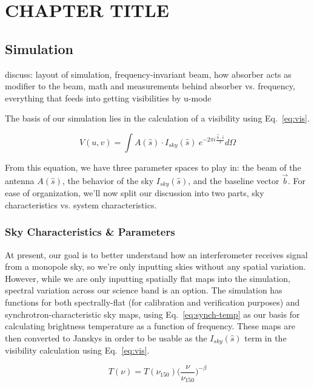 \chapter{CHAPTER TITLE}

\section{Simulation}

discuss: layout of simulation, frequency-invariant beam, how absorber acts as 
modifier to the beam, math and measurements behind absorber vs. frequency, 
everything that feeds into getting visibilities by u-mode

The basis of our simulation lies in the calculation of a visibility using 
Eq.~\eqref{eq:vis}.

\begin{equation}
    \label{eq:vis}
    V(u,v) = \int A(\hat{s}) \cdot I_{sky}(\hat{s}) ~e^{-2 \pi i \frac{\vec{b} 
    \cdot \hat{s}}{\lambda}} d\Omega
\end{equation}

From this equation, we have three parameter spaces to play in: the beam of the 
antenna $A(\hat{s})$, the behavior of the sky $I_{sky}(\hat{s})$, and the 
baseline vector $\vec{b}$. For ease of organization, we'll now split our 
discussion into two parts, sky characteristics vs. system characteristics.

\subsection{Sky Characteristics \& Parameters}

At present, our goal is to better understand how an interferometer receives 
signal from a monopole sky, so we're only inputting skies without any
spatial variation. However, while we are only inputting spatially flat maps 
into the simulation, spectral variation across our science band is an option.  
The simulation has functions for both spectrally-flat (for calibration and 
verification purposes) and synchrotron-characteristic sky maps, using 
Eq.~\eqref{eq:synch-temp} as our basis for calculating brightness temperature 
as a function of frequency.  These maps are then converted to Janskys in order 
to be usable as the $I_{sky}(\hat{s})$ term in the visibility calculation using 
Eq.~\eqref{eq:vis}.

\begin{equation}
    \label{eq:synch-temp}
    T(\nu) = T(\nu_{150}) \Big(\frac{\nu}{\nu_{150}} \Big)^{-\beta}
\end{equation}

